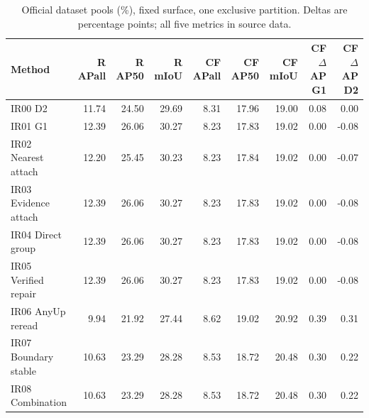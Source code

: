 \begin{table}[t]
\centering
\small
\begin{tabular}{lrrrrrrrr}
\toprule
Method & R APall & R AP50 & R mIoU & CF APall & CF AP50 & CF mIoU & CF $\Delta$AP G1 & CF $\Delta$AP D2 \\
\midrule
IR00 D2 & 11.74 & 24.50 & 29.69 & 8.31 & 17.96 & 19.00 & 0.08 & 0.00 \\
IR01 G1 & 12.39 & 26.06 & 30.27 & 8.23 & 17.83 & 19.02 & 0.00 & -0.08 \\
IR02 Nearest attach & 12.20 & 25.45 & 30.23 & 8.23 & 17.84 & 19.02 & 0.00 & -0.07 \\
IR03 Evidence attach & 12.39 & 26.06 & 30.27 & 8.23 & 17.83 & 19.02 & 0.00 & -0.08 \\
IR04 Direct group & 12.39 & 26.06 & 30.27 & 8.23 & 17.83 & 19.02 & 0.00 & -0.08 \\
IR05 Verified repair & 12.39 & 26.06 & 30.27 & 8.23 & 17.83 & 19.02 & 0.00 & -0.08 \\
IR06 AnyUp reread & 9.94 & 21.92 & 27.44 & 8.62 & 19.02 & 20.92 & 0.39 & 0.31 \\
IR07 Boundary stable & 10.63 & 23.29 & 28.28 & 8.53 & 18.72 & 20.48 & 0.30 & 0.22 \\
IR08 Combination & 10.63 & 23.29 & 28.28 & 8.53 & 18.72 & 20.48 & 0.30 & 0.22 \\
\bottomrule
\end{tabular}
\caption{Official dataset pools (\%), fixed surface, one exclusive partition. Deltas are percentage points; all five metrics in source data.}
\label{tab:minimal-repair-1}
\end{table}
